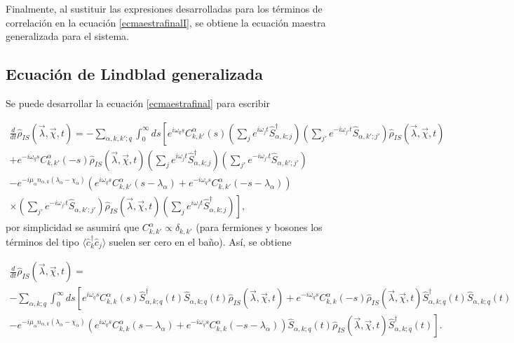 \begin{appendixs}
Finalmente, al sustituir las expresiones desarrolladas para los términos de correlación en la ecuación \ref{ecmaestrafinalI}, se obtiene la ecuación maestra generalizada para el sistema.
\label{finalequation}

\newpage

\subsection{Ecuación de Lindblad generalizada}
Se puede desarrollar la ecuación \ref{ecmaestrafinal} para escribir

\begin{multline*}
    \frac{d}{dt}\hat{\rho}_{IS}(\vec{\lambda},\vec{\chi},t) = - \sum_{\alpha,k,k';q} \int_{0}^{\infty}ds \left[e^{i\omega_{q}s}C^{\alpha}_{k,k'}(s) \left(\sum_{j}e^{i\omega_{j}t}\hat{S}^{\dagger}_{\alpha,k;j} \right)\left(\sum_{j'}e^{-i\omega_{j'}t}\hat{S}_{\alpha,k';j'} \right)\hat{\rho}_{IS}(\vec{\lambda},\vec{\chi},t)  \right. \\
    \left. +  e^{-i\omega_{q}s}C^{\alpha}_{k,k'}(-s) \hat{\rho}_{IS}(\vec{\lambda},\vec{\chi},t) \left(\sum_{j}e^{i\omega_{j}t}\hat{S}^{\dagger}_{\alpha,k;j} \right)\left(\sum_{j'}e^{-i\omega_{j'}t}\hat{S}_{\alpha,k';j'} \right)\right. \\
    \left. - e^{-i\mu_{\alpha}n_{\alpha,k}(\lambda_{\alpha}-\chi_{\alpha})}(e^{i\omega_{q}s}C^{\alpha}_{k,k'}(s-\lambda_{\alpha}) + e^{-i\omega_{q}s}C^{\alpha}_{k,k'}(-s-\lambda_{\alpha}) ) \right.\\
    \left.\times \left(\sum_{j'}e^{-i\omega_{j'}t}\hat{S}_{\alpha,k';j'} \right)\hat{\rho}_{IS}(\vec{\lambda},\vec{\chi},t) \left(\sum_{j}e^{i\omega_{j}t}\hat{S}^{\dagger}_{\alpha,k;j} \right)    \right],   
\end{multline*}
por simplicidad se asumirá que $C_{k,k'}^{\alpha} \propto \delta_{k,k'}$ (para fermiones y bosones los  términos del tipo $\langle \hat{c}^{\dagger}_{k}\hat{c}_{j}\rangle$ suelen ser cero en el baño)\cite{potts2021thermodynamically}. Así, se obtiene 

\begin{multline*}
    \frac{d}{dt}\hat{\rho}_{IS}(\vec{\lambda},\vec{\chi},t) = \\
     - \sum_{\alpha,k;q} \int_{0}^{\infty}ds \left[e^{i\omega_{q}s}C^{\alpha}_{k,k}(s) \hat{S}^{\dagger}_{\alpha,k;q}(t)\hat{S}_{\alpha,k;q}(t)\hat{\rho}_{IS}(\vec{\lambda},\vec{\chi},t)  +  e^{-i\omega_{q}s}C^{\alpha}_{k,k}(-s) \hat{\rho}_{IS}(\vec{\lambda},\vec{\chi},t) \hat{S}^{\dagger}_{\alpha,k;q}(t) \hat{S}_{\alpha,k;q}(t) \right. \\
    \left. - e^{-i\mu_{\alpha}n_{\alpha,k}(\lambda_{\alpha}-\chi_{\alpha})}(e^{i\omega_{q}s}C^{\alpha}_{k,k}(s-\lambda_{\alpha}) + e^{-i\omega_{q}s}C^{\alpha}_{k,k}(-s-\lambda_{\alpha}) ) \hat{S}_{\alpha,k;q}(t) \hat{\rho}_{IS}(\vec{\lambda},\vec{\chi},t) \hat{S}^{\dagger}_{\alpha,k;q}(t)    \right].  
\end{multline*}


\end{appendixs}
